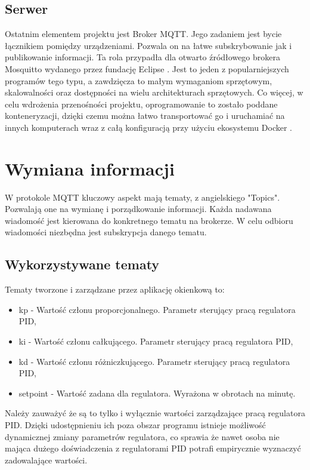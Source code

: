         \subsection{Serwer}
            Ostatnim elementem projektu jest Broker MQTT. Jego zadaniem jest bycie łącznikiem pomiędzy urządzeniami. Pozwala on na łatwe subskrybowanie jak i publikowanie informacji. Ta rola przypadła dla otwarto źródłowego brokera Mosquitto wydanego przez fundację Eclipse \cite{mosquitto}. Jest to jeden z popularniejszych programów tego typu, a zawdzięcza to małym wymaganiom sprzętowym, skalowalności oraz
            dostępności na wielu architekturach sprzętowych. Co więcej, w celu wdrożenia
            przenośności projektu, oprogramowanie to zostało poddane konteneryzacji,
            dzięki czemu można łatwo transportować go i uruchamiać na innych komputerach wraz z całą konfiguracją przy użyciu ekosystemu Docker \cite{docker}.
            
 
    \section{Wymiana informacji}
        
        W protokole MQTT kluczowy aspekt mają tematy, z angielskiego "Topics". Pozwalają one na wymianę i porządkowanie informacji. Każda nadawana wiadomość jest kierowana do konkretnego tematu na brokerze. W celu odbioru wiadomości niezbędna jest subskrypcja danego tematu.

    \subsection{Wykorzystywane tematy}
        Tematy tworzone i zarządzane przez aplikację okienkową to:
    
        \begin{itemize}
          \item kp - Wartość członu proporcjonalnego. Parametr sterujący pracą regulatora PID,
          \item ki - Wartość członu całkującego. Parametr sterujący pracą regulatora PID,
          \item kd - Wartość członu różniczkującego. Parametr sterujący pracą regulatora PID, 
          \item setpoint - Wartość zadana dla regulatora. Wyrażona w obrotach na minutę. 
        \end{itemize}
    
        Należy zauważyć że są to tylko i wyłącznie wartości zarządzające pracą regulatora PID. Dzięki udostępnieniu ich poza obszar programu istnieje możliwość dynamicznej zmiany parametrów regulatora, co sprawia że nawet osoba nie mająca dużego doświadczenia z regulatorami PID potrafi empirycznie wyznaczyć zadowalające wartości. 
        
